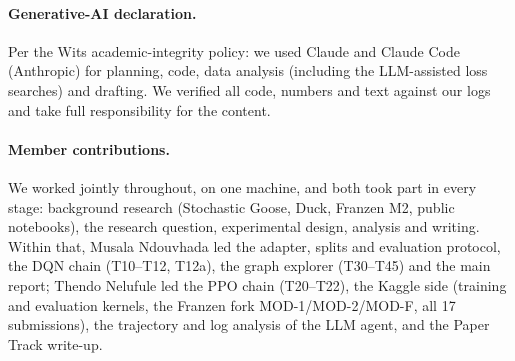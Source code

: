 \documentclass[10pt]{article}
\newcommand{\Tn}[1]{T#1\xspace}
\begin{document}
\paragraph{Generative-AI declaration.} Per the Wits academic-integrity policy: we used Claude and Claude Code (Anthropic) for planning, code, data analysis (including the LLM-assisted loss searches) and drafting. We verified all code, numbers and text against our logs and take full responsibility for the content.
\paragraph{Member contributions.} We worked jointly throughout, on one machine, and both took part in every stage: background research (Stochastic Goose, Duck, Franzen M2, public notebooks), the research question, experimental design, analysis and writing. Within that, Musala Ndouvhada led the adapter, splits and evaluation protocol, the DQN chain (\Tn{10}--\Tn{12}, \Tn{12a}), the graph explorer (\Tn{30}--\Tn{45}) and the main report; Thendo Nelufule led the PPO chain (\Tn{20}--\Tn{22}), the Kaggle side (training and evaluation kernels, the Franzen fork MOD-1/MOD-2/MOD-F, all 17 submissions), the trajectory and log analysis of the LLM agent, and the Paper Track write-up.




\beginSupplementaryMaterials
\end{document}
